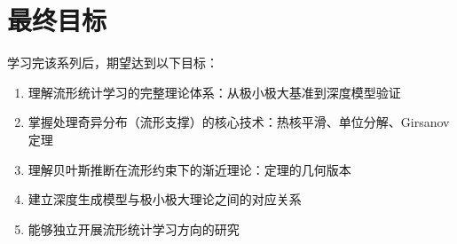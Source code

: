 \section{最终目标}

学习完该系列后，期望达到以下目标：

\begin{enumerate}
    \item 理解流形统计学习的完整理论体系：从极小极大基准到深度模型验证
    \item 掌握处理奇异分布（流形支撑）的核心技术：热核平滑、单位分解、Girsanov 定理
    \item 理解贝叶斯推断在流形约束下的渐近理论：\BvM 定理的几何版本
    \item 建立深度生成模型与极小极大理论之间的对应关系
    \item 能够独立开展流形统计学习方向的研究
\end{enumerate}
